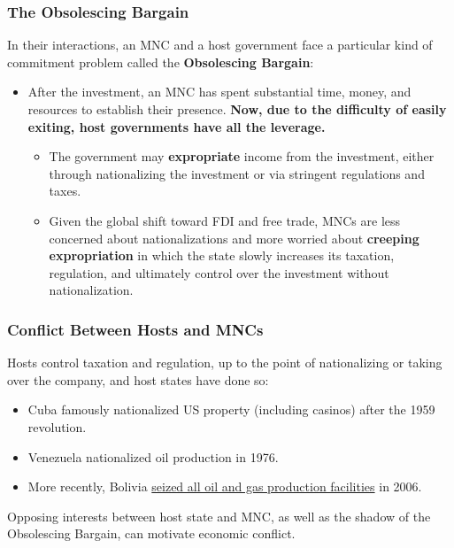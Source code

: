 \documentclass[handout]{beamer}
\begin{document}
\begin{frame} 
	\frametitle{\LARGE{The Obsolescing Bargain}}
	In their interactions, an MNC and a host government face a particular kind of commitment problem called the \textbf{Obsolescing Bargain}:
	\begin{itemize}
		\item After the investment, an MNC has spent substantial time, money, and resources to establish their presence. \textbf{Now, due to the difficulty of easily exiting, host governments have all the leverage.} \pause 
		\begin{itemize}
			\item The government may \textbf{expropriate} income from the investment, either through nationalizing the investment or via stringent regulations and taxes. \pause
			\item Given the global shift toward FDI and free trade, MNCs are less concerned about nationalizations and more worried about \textbf{creeping expropriation} in which the state slowly increases its taxation, regulation, and ultimately control over the investment without nationalization.
		\end{itemize}
	\end{itemize}
	
\end{frame}



\begin{frame} 
	\frametitle{\LARGE{Conflict Between Hosts and MNCs}}
	\begin{itemize}
		\large{
			\item Hosts control taxation and regulation, up to the point of nationalizing or taking over the company, and host states have done so: \pause 
			\begin{itemize}
				\item Cuba famously nationalized US property (including casinos) after the 1959 revolution. \pause 
				\item Venezuela nationalized oil production in 1976. \pause
				\item More recently, Bolivia \href{https://www.cfr.org/backgrounder/bolivias-nationalization-oil-and-gas}{seized all oil and gas production facilities} in 2006.
			\end{itemize}
			\item Opposing interests between host state and MNC, as well as the shadow of the Obsolescing Bargain, can motivate economic conflict.
		}
	\end{itemize}
\end{frame}
\end{document}
